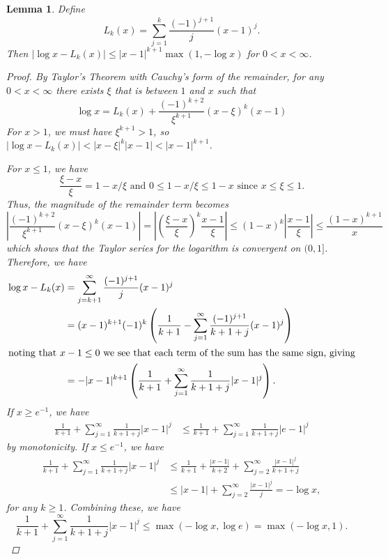 \documentclass[a4paper, 10pt]{report}
\theoremstyle{plain}
\newtheorem{lemma}[theorem]{Lemma}
\begin{document}
	\begin{lemma}
		\label{lemma:log}
		Define 
		\begin{equation}
		L_k(x) = \sum_{j=1}^k \frac{(-1)^{j+1}}{j}(x-1)^j.
		\end{equation}
		Then $|\log x - L_k(x)| \le |x-1|^{k+1}\max(1, -\log x)$ for $0<x<\infty$.
		\begin{proof}
			By Taylor's Theorem with Cauchy's form of the remainder, for any $0 < x < \infty$ there exists $\xi$ that is between $1$ and $x$ such that
			\begin{equation}
			\log x = L_k(x) + \frac{(-1)^{k+2}}{\xi^{k+1}}(x-\xi)^k(x-1)
			\end{equation}
			For $x>1$, we must have $\xi^{k+1} > 1$, so $|\log x - L_k(x)| < |x-\xi|^k |x-1| < |x-1|^{k+1}$.
			
			For $x \le 1$, we have
			\begin{equation}
			\frac{\xi - x}{\xi} = 1 - x / \xi \text{ and } 0 \le 1 - x/\xi \le 1 - x \text{ since } x \le \xi \le 1.
			\end{equation}
			Thus, the magnitude of the remainder term becomes
			\begin{equation}
			\left|\frac{(-1)^{k+2}}{\xi^{k+1}}(x-\xi)^k(x-1)\right| = \left|\left(\frac{\xi-x}{\xi}\right)^k \frac{x-1}{\xi} \right| \le (1-x)^k \left| \frac{x-1}{\xi} \right| \le \frac{(1-x)^{k+1}}{x}
			\end{equation}
			which shows that the Taylor series for the logarithm is convergent on $(0, 1]$.
			Therefore, we have
			\begin{align}
			\log x - L_k(x) &= \sum_{j=k+1}^\infty \frac{(-1)^{j+1}}{j}(x-1)^j \\
			&= (x-1)^{k+1}(-1)^{k} \left( \frac{1}{k+1} - \sum_{j=1}^\infty \frac{(-1)^{j+1}}{k+1+j}(x-1)^j \right)\\
			\intertext{noting that $x-1\le0$ we see that each term of the sum has the same sign, giving}
			&= -|x-1|^{k+1} \left( \frac{1}{k+1} + \sum_{j=1}^\infty \frac{1}{k+1+j}|x-1|^j \right).
			\end{align}
			If $x \ge e^{-1}$, we have
			\begin{align}
			\frac{1}{k+1} + \sum_{j=1}^\infty \frac{1}{k+1+j}|x-1|^j  &\le  \frac{1}{k+1} + \sum_{j=1}^\infty \frac{1}{k+1+j}|e-1|^j 
			\end{align}
			by monotonicity. If $x \le e^{-1}$, we have 
			\begin{align}
			\frac{1}{k+1} + \sum_{j=1}^\infty \frac{1}{k+1+j}|x-1|^j &\le \frac{1}{k+1} + \frac{|x-1|}{k+2} +  \sum_{j=2}^\infty \frac{|x-1|^j}{k+1+j} \\
			&\le |x-1| + \sum_{j=2}^\infty \frac{|x-1|^j}{j} = -\log x,
			\end{align}
			for any $k \ge 1$.
			Combining these, we have
			\begin{equation}
			\frac{1}{k+1} + \sum_{j=1}^\infty \frac{1}{k+1+j}|x-1|^j  \le \max(-\log x, \log e) = \max(-\log x, 1).
			\end{equation}
		\end{proof}
	\end{lemma}
\end{document}
